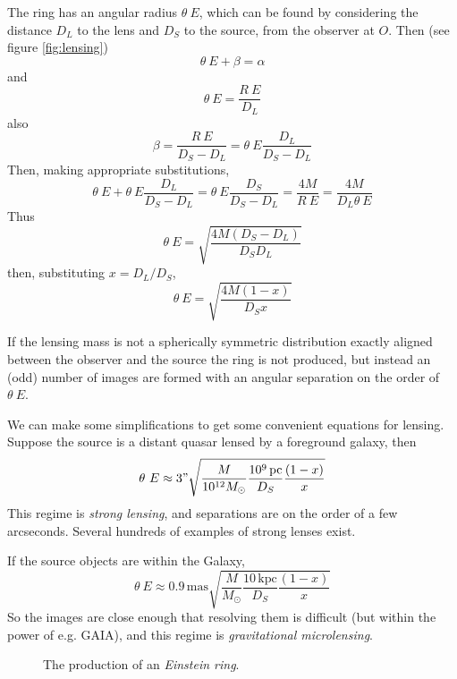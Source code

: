 The ring has an angular radius $\theta~E$, which can be found by
considering the distance $D_L$ to the lens and $D_S$ to the source,
from the observer at $O$. Then (see figure \ref{fig:lensing}) 
\[ \theta~E + \beta = \alpha \]
and 
\[ \theta~E = \frac{R~E}{D_L} \]
also
\[ \beta = \frac{R~E}{D_S - D_L} = \theta~E \frac{D_L}{D_S-D_L} \]
Then, making appropriate substitutions,
\begin{equation*}
  \label{eq:180}
  \theta~E + \theta~E \frac{D_L}{D_S-D_L} = \theta~E \frac{D_S}{D_S - D_L} = \frac{4M}{R~E} = \frac{4M}{D_L \theta~E}
\end{equation*}
Thus
\begin{equation}
  \label{eq:181}
  \theta~E = \sqrt{ \frac{4M (D_S-D_L)}{D_SD_L} }
\end{equation}
then, substituting $x = D_L/D_S$,
\begin{equation}
  \label{eq:182}
  \theta~E = \sqrt{ \frac{4M(1-x)}{D_S x}}
\end{equation}

If the lensing mass is not a spherically symmetric distribution
exactly aligned between the observer and the source the ring is not
produced, but instead an (odd) number of images are formed with an
angular separation on the order of $\theta~E$.

We can make some simplifications to get some convenient equations for
lensing. Suppose the source is a distant quasar lensed by a foreground
galaxy, then
\begin{equation}
  \label{eq:183}
  \theta~E \approx 3" \sqrt{ \frac{M}{10^{12} M_{\odot}} \frac{10^9\, \text{pc}}{D_S} \frac{(1-x)}{x} }
\end{equation}
This regime is \emph{strong lensing}, and separations are on the order
of a few arcseconds. Several hundreds of examples of strong lenses exist.

If the source objects are within the Galaxy,
\begin{equation}
  \label{eq:184}
  \theta~E \approx 0.9\, \text{mas} \sqrt{ \frac{M}{M_{\odot}} \frac{10\,\text{kpc}}{D_S} \frac{(1-x)}{x}}
\end{equation}
So the images are close enough that resolving them is difficult (but
within the power of e.g. GAIA), and this regime is \emph{gravitational
  microlensing}.

\begin{figure}[b]
  \centering
  \caption{The production of an \emph{Einstein ring}.}
  \label{fig:lensing-2}
\end{figure}


